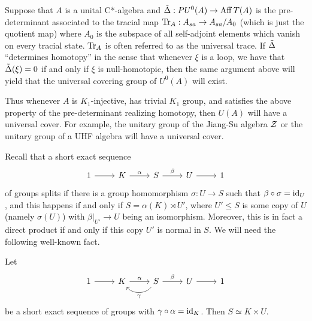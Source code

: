 \documentclass{amsart}
\begin{document}
\begin{remark}
Suppose that $A$ is a unital C*-algebra and $\tilde{\Delta}: PU^0(A) \to \operatorname{Aff} T(A)$ is the pre-determinant associated to the tracial map $\text{Tr}_A: A_{sa} \to A_{sa}/A_0$ (which is just the quotient map) where $A_0$ is the subspace of all self-adjoint elements which vanish on every tracial state. $\text{Tr}_A$ is often referred to as the universal trace.
If $\tilde{\Delta}$ ``determines homotopy'' in the sense that whenever $\xi$ is a loop, we have that $\tilde{\Delta}(\xi) = 0$ if and only if $\xi$ is null-homotopic, then the same argument above will yield that the universal covering group of $U^0(A)$ will exist. 

Thus whenever $A$ is $K_1$-injective, has trivial $K_1$ group, and satisfies the above property of the pre-determinant realizing homotopy, then $U(A)$ will have a universal cover.
For example, the unitary group of the Jiang-Su algebra $\mathcal{Z}$ \cite{JiangSu99} or the unitary group of a UHF algebra will have a universal cover.
\end{remark}

Recall that a short exact sequence
\begin{equation}
\begin{tikzcd}
1 \arrow[r] & K \arrow[r, "\alpha"] & S \arrow[r, "\beta"] & U \arrow[r] & 1
\end{tikzcd}
\end{equation}
of groups splits if there is a group homomorphism $\sigma: U \to S$ such that $\beta \circ \sigma = \text{id}_U$, and this happens if and only if $S = \alpha(K) \rtimes U'$, where $U' \leq S$ is some copy of $U$ (namely $\sigma(U)$) with $\beta|_{U'} \to U$ being an isomorphism. Moreover, this is in fact a direct product if and only if this copy $U'$ is normal in $S$. We will need the following well-known fact.

\begin{lemma}\label{lem:left split ses}
Let
\begin{equation}
\begin{tikzcd}
1 \arrow[r] & K \arrow[r, "\alpha"] & S \arrow[r, "\beta"] \arrow[l, "\gamma", bend left=49] & U \arrow[r] & 1
\end{tikzcd}
\end{equation}
be a short exact sequence of groups with $\gamma \circ \alpha = \text{id}_K$. Then $S \simeq K \times U$.
\end{lemma}
\end{document}
